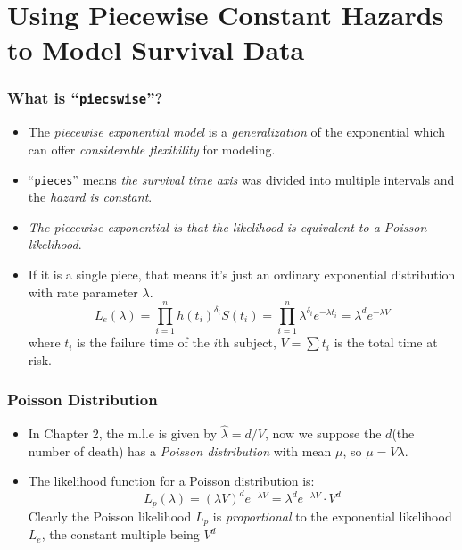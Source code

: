 \documentclass{beamer}
\newcommand{\empr}[1]{{\emph{\color{red}#1}}}
\begin{document}
\section{Using Piecewise Constant Hazards to Model Survival Data}
\begin{frame}
\frametitle{What is ``\texttt{piecswise}''?}
\begin{itemize}
\item The \empr{piecewise exponential model} is a \empr{generalization} of the exponential which can offer \empr{considerable flexibility} for modeling.
\item  ``\texttt{pieces}'' means \empr{the survival time axis} was divided into multiple intervals and the \empr{hazard is constant}.
\item \empr{The piecewise exponential is that the likelihood is equivalent to a Poisson likelihood}.
\item If it is a single piece, that means it's just an ordinary exponential distribution with rate parameter $\lambda$.
\begin{equation}
L_e(\lambda) = \prod\limits_{i=1}^{n}h(t_i)^{\delta_i}S(t_i) = \prod\limits_{i=1}^{n}\lambda^{\delta_i}e^{-\lambda t_i} = \lambda^d e^{-\lambda V}
\end{equation}
where $t_i$ is the failure time of the $i$th subject, $V = \sum t_i$ is the total time at risk. 
\end{itemize}
\end{frame}

\pagebreak
\begin{frame}
\frametitle{Poisson Distribution}
\begin{itemize}
\item In Chapter 2, the m.l.e is given by $\hat{\lambda} = d/V$, now we suppose the $d$(the number of death) has a \empr{Poisson distribution} with mean $\mu$, so $\mu = V\lambda$.
\item The likelihood function for a Poisson distribution is:
\begin{equation}
L_p(\lambda) = (\lambda V)^d e^{-\lambda V} = \lambda^d e^{-\lambda V}\cdot V^d
\end{equation}
Clearly the Poisson likelihood $L_p$ is \empr{proportional} to the exponential likelihood $L_e$, the constant multiple being $V^d$
\end{itemize}
\end{frame}
\end{document}

